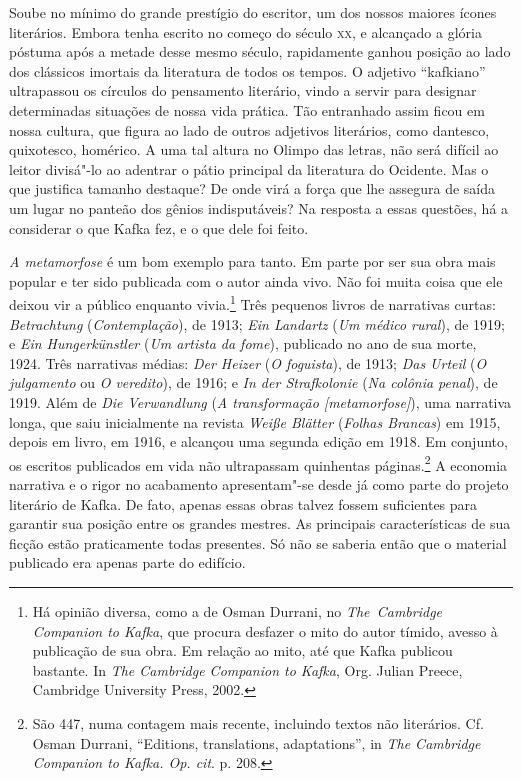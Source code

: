 Soube no mínimo do grande prestígio do escritor, um dos nossos maiores
ícones literários. Embora tenha escrito no começo do século \textsc{xx}, e
alcançado a glória póstuma após a metade desse mesmo século,
rapidamente ganhou posição ao lado dos clássicos imortais da literatura
de todos os tempos. O adjetivo “kafkiano” ultrapassou os círculos do
pensamento literário, vindo a servir para designar determinadas
situações de nossa vida prática. Tão entranhado assim ficou em nossa
cultura, que figura ao lado de outros adjetivos literários, como dantesco, quixotesco,
homérico. A uma tal altura no Olimpo das letras, não será difícil ao
leitor divisá"-lo ao adentrar o pátio principal da literatura do
Ocidente. Mas o que justifica tamanho destaque? De onde virá a força
que lhe assegura de saída um lugar no panteão dos gênios indisputáveis?
Na resposta a essas questões, há a considerar o que Kafka fez, e o que
dele foi feito.

\textit{A metamorfose} é um bom exemplo para tanto. Em parte por ser sua
obra mais popular e ter sido publicada com o autor ainda vivo. Não
foi muita coisa que ele deixou vir a público enquanto vivia.\footnote{
Há opinião diversa, como a de Osman Durrani, no \textit{\mbox{The Cambridge}
Companion to Kafka}, que procura desfazer o mito do autor tímido, avesso à
publicação de sua obra. Em relação ao mito, até que Kafka publicou
bastante. In \textit{The Cambridge
Companion to Kafka}, Org. Julian Preece, Cambridge University Press,
2002.} Três pequenos livros de narrativas curtas:
\textit{Betrachtung} (\textit{Contemplação}), de 1913; \textit{Ein
Landartz} (\textit{Um médico rural}), de 1919; e \textit{Ein
Hungerkünstler} (\textit{Um artista da fome}), publicado no ano de sua
morte, 1924. Três narrativas médias: \textit{Der Heizer} (\textit{O
foguista}), de 1913; \textit{Das Urteil} (\textit{O julgamento} ou
\textit{O veredito}), de 1916; e \textit{In der Strafkolonie}
(\textit{Na colônia penal}), de 1919. Além de \textit{Die Verwandlung}
(\textit{A transformação [metamorfose]}), uma narrativa
longa, que saiu inicialmente na revista \textit{Weiße Blätter}
(\textit{Folhas Brancas}) em 1915, depois em livro, em 1916, e alcançou
uma segunda edição em 1918. Em conjunto, os escritos publicados em vida
não ultrapassam quinhentas páginas.\footnote{ São 447, numa contagem
mais recente, incluindo textos não literários. Cf. Osman Durrani,
“Editions, translations, adaptations”, in \textit{The Cambridge
Companion to Kafka. Op. cit}. p. 208.} A economia narrativa e o rigor no acabamento
apresentam"-se desde já como parte do projeto literário de Kafka. De
fato, apenas essas obras talvez fossem suficientes para garantir sua
posição entre os grandes mestres. As principais características de sua
ficção estão praticamente todas presentes. Só não se saberia então que
o material publicado era apenas parte do edifício.

